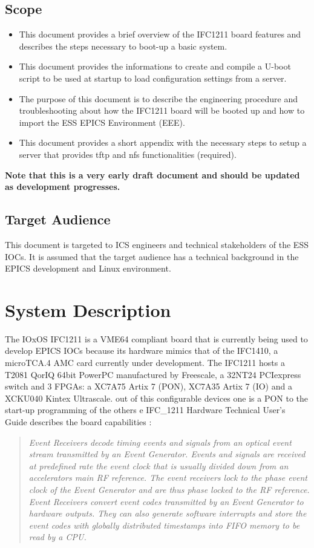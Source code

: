 \documentclass[11pt
  , a4paper
  , article
  , oneside
  , showtrims
]{memoir}
\begin{document}
\section{Scope}
\begin{itemize}
\item This document provides a brief overview of the IFC1211 board features and describes the steps necessary to boot-up a basic system.
\item This document provides the informations to create and compile a U-boot script to be used at startup to load configuration settings from a server. 
\item The purpose of this document is to describe the engineering procedure and troubleshooting about how the IFC1211 board will be booted up and how to import the ESS EPICS Environment (EEE).
\item This document provides a short appendix with the necessary steps to setup a server that provides tftp and nfs functionalities (required). 
\end{itemize}
\textbf{Note that this is a very early draft document and should be updated as development progresses.}

\section{Target Audience}
This document is targeted to ICS engineers and technical stakeholders of the ESS IOCs. It is assumed that the target audience has a technical background in the EPICS development and Linux environment.

\chapter{System Description}
The IOxOS IFC1211 is a VME64 compliant board that is currently being used to develop EPICS IOCs because its hardware mimics that of the IFC1410, a microTCA.4 AMC card currently under development.
The IFC1211 hosts a T2081 QorIQ 64bit PowerPC manufactured by Freescale, a 32NT24 PCIexpress switch and 3 FPGAs: a XC7A75 Artix 7 (PON), XC7A35 Artix 7 (IO) and a XCKU040 Kintex Ultrascale.
out of this configurable devices one is a PON to the start-up programming of the others e
IFC_1211 Hardware Technical User's Guide \cite{IFC1211_HW_TUG} describes the board capabilities :
\blockquote{\textit{Event Receivers decode timing events and signals from an optical event stream transmitted by an Event Generator. Events and signals are received at predefined rate the event clock that is usually divided down from an accelerators main RF reference. The event receivers lock to the phase event clock of the Event Generator and are thus phase locked to the RF reference. Event Receivers convert event codes transmitted by an Event Generator to hardware outputs. They can also generate software interrupts and store the event codes with globally distributed timestamps into FIFO memory to be read by a CPU.}}
\end{document}
